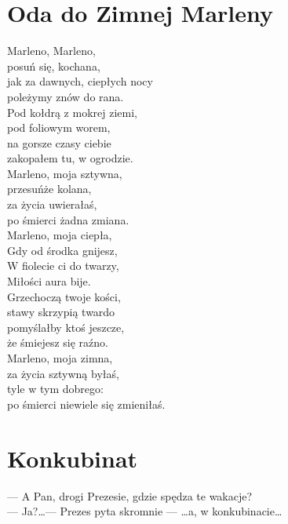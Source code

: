 \documentclass[12pt, a4paper]{memoir}
\renewenvironment{verse}{%
  \par\vspace{\baselineskip}\raggedright
}{
  \par\vspace{\baselineskip}
}
\begin{document}
\newpage
\section{Oda do Zimnej Marleny}
\begin{verse}
Marleno, Marleno,\\
posuń się, kochana,\\
jak za dawnych, ciepłych nocy\\
poleżymy znów do rana.\\[\baselineskip]

Pod kołdrą z mokrej ziemi,\\
pod foliowym worem,\\
na gorsze czasy ciebie\\
zakopałem tu, w ogrodzie.\\[\baselineskip]

Marleno, moja sztywna,\\
przesuńże kolana,\\
za życia uwierałaś,\\
po śmierci żadna zmiana.\\[\baselineskip]

Marleno, moja ciepła,\\
Gdy od środka gnijesz,\\
W fiolecie ci do twarzy,\\
Miłości aura bije.\\[\baselineskip]

Grzechoczą twoje kości,\\
stawy skrzypią twardo\\
pomyślałby ktoś jeszcze,\\
że śmiejesz się raźno.\\[\baselineskip]

Marleno, moja zimna,\\
za życia sztywną byłaś,\\
tyle w tym dobrego:\\
po śmierci niewiele się zmieniłaś.
\end{verse}

\newpage
\section{Konkubinat}
\begin{verse}
--- A Pan, drogi Prezesie, gdzie spędza te wakacje?\\[\baselineskip]
--- Ja?\dots --- Prezes pyta skromnie --- \dots a, w konkubinacie\dots
\end{verse}
\end{document}
